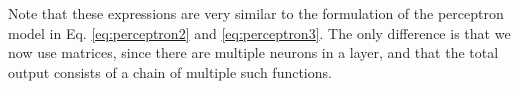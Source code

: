 Note that these expressions are very similar to the formulation of the perceptron model in Eq. \eqref{eq:perceptron2} and \eqref{eq:perceptron3}. The only difference is that we now use matrices, since there are multiple neurons in a layer, and that the total output consists of a chain of multiple such functions.

\begin{comment}
\begin{equation}
f(\bm{x}) = f^{(L)}(\bm{W}^{(L)\top}f^{(L-1)}(\bm{W}^{(L-1)\top}\dotsm+\bm{b}^{(l-1)})+\bm{b}^{(L)}
\end{equation}
\end{comment}